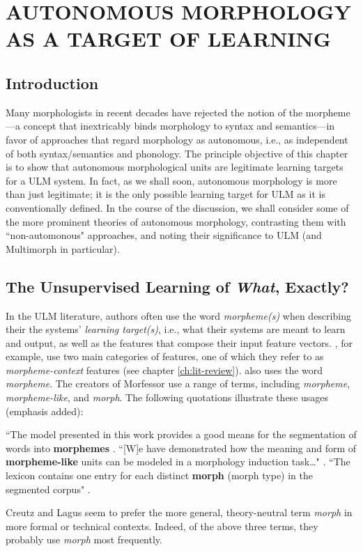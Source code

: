 \chapter{AUTONOMOUS MORPHOLOGY AS A TARGET OF LEARNING}
\label{autonomous}

\section{Introduction}
Many morphologists in recent decades have rejected the notion of the morpheme---a concept that inextricably binds morphology to syntax and semantics---in favor of approaches that regard morphology as autonomous, i.e., as independent 
of both syntax/semantics and phonology. The principle objective of this chapter is to 
show that autonomous morphological units are legitimate learning targets for a \ac{ULM}  system. In fact, as we shall soon, autonomous morphology is more than just legitimate; it is the only possible learning target for \ac{ULM}  as it is conventionally defined.
In the course of the discussion, we shall consider some of the more prominent theories of autonomous morphology, contrasting them with ``non-automonous" approaches, and  noting their significance to \ac{ULM} (and Multimorph in particular).


\section{The Unsupervised Learning of \textit{What}, Exactly?}
\label{sec:what-exactly}
In the \ac{ULM} literature, authors often use the word \emph{morpheme(s)} 
when describing their the systems' \emph{learning target(s)}, i.e., what their systems are meant to learn and 
output, as well as the features that compose their input feature vectors.
\cite{poon-et-al:2009}, for example, use two main categories 
of features, one of which they refer to as \emph{morpheme-context} features (see chapter \ref{ch:lit-review}).
\cite{goldsmith:2001, goldsmith:2006} also uses the word 
\emph{morpheme}.
The creators of Morfessor 
\citep{creutz-and-lagus:2002, 
creutz-and-lagus:2005, creutz-and-lagus:2007}
use a range of terms, including 
\emph{morpheme},
\emph{morpheme-like}, and \emph{morph}. The following quotations 
illustrate these usages (emphasis added):
\begin{exe}
\ex ``The model presented in this 
work provides a good means for the segmentation of words into 
\textbf{morphemes} \citep[][p. 6]{creutz-and-lagus:2007}. 
\ex``[W]e have demonstrated how the meaning and form of 
\textbf{morpheme-like} units can be modeled in a 
morphology induction task\dots" \citep{creutz-and-lagus:2005}.
\ex``The lexicon contains one entry for each distinct \textbf{morph} 
(morph type) in the 
segmented corpus" \citep[][p. 9]{creutz-and-lagus:2007}. 
\end{exe}
Creutz and Lagus seem to prefer the more general, theory-neutral term \emph{morph} 
in more formal or technical contexts. Indeed,
of the above three terms, they probably use 
\emph{morph} most frequently.

